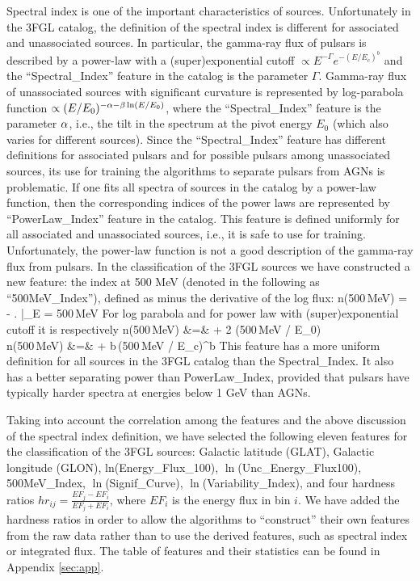 Spectral index is one of the important characteristics of sources. 
Unfortunately in the 3FGL catalog, the definition of the spectral index is different for associated and unassociated sources.
In particular, the gamma-ray flux of pulsars is described by a power-law with a (super)exponential cutoff $\propto E^{-\Gamma} e^{-(E / E_c)^b}$ and the ``Spectral\_Index'' feature in the catalog is the parameter $\Gamma$.
Gamma-ray flux of unassociated sources with significant curvature is represented by log-parabola function $\propto (E/E_0)^{-\alpha - \beta \ln (E/E_0)}$,
where the ``Spectral\_Index'' feature is the parameter $\alpha$, i.e., the tilt in the spectrum at the pivot energy $E_0$ (which also varies for different sources).
Since the ``Spectral\_Index'' feature has different definitions for associated pulsars and for possible pulsars among unassociated sources,
its use for training the algorithms to separate pulsars from AGNs is problematic.
If one fits all spectra of sources in the catalog by a power-law function, then the corresponding indices of the power laws are represented by
``PowerLaw\_Index'' feature in the catalog.
This feature is defined uniformly for all associated and unassociated sources, i.e., it is safe to use for training.
Unfortunately, the power-law function is not a good description of the gamma-ray flux from pulsars.
In the classification of the 3FGL sources we have constructed a new feature: the index at 500 MeV (denoted in the following as ``500MeV\_Index''), defined as minus the derivative of the log flux:
\be
{}
n({\rm 500\,MeV}) = - \left.  \right|_{E = \rm 500\,MeV}
\ee
For log parabola and for power law with (super)exponential cutoff it is respectively
\bea
n(\rm 500\,MeV) &=& \al + 2 \bt \ln(\rm 500\,MeV / E_0)    \\
n({\rm 500\,MeV}) &=& \Gamma + b\,({\rm 500\,MeV} / E_c)^b
\eea
This feature has a more uniform definition for all sources in the 3FGL catalog than the Spectral\_Index. It also has a better separating power 
than PowerLaw\_Index, provided that pulsars have typically harder spectra at energies below 1 GeV than AGNs.

Taking into account the correlation among the features and the above discussion of the spectral index definition,
we have selected the following eleven features for the classification of the 3FGL sources:
Galactic latitude (GLAT), Galactic longitude (GLON), ln(Energy\_Flux\_100), $\ln$(Unc\_Energy\_Flux100), 500MeV\_Index, $\ln$(Signif\_Curve), 
$\ln$(Variability\_Index), and four hardness ratios $hr_{ij} = \frac{EF_j - EF_i}{EF_j + EF_i}$, where $EF_i$ is the energy flux in bin $i$.
We have added the hardness ratios in order to allow the algorithms to ``construct'' their own features from the raw data rather than to use the 
derived features, such as spectral index or integrated flux.
The table of features and their statistics can be found in Appendix \ref{sec:app}.







